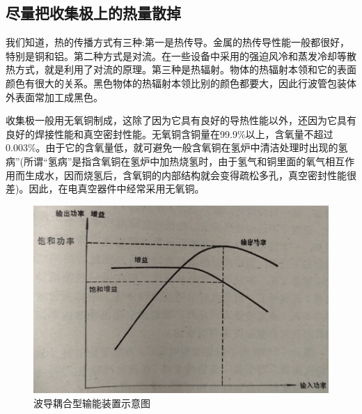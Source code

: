 \subsection{尽量把收集极上的热量散掉}
我们知道，热的传播方式有三种:第一是热传导。金属的热传导性能一般都很好，特别是铜和铝。第二种方式是对流。在一些设备中采用的强迫风冷和蒸发冷却等散热方式，就是利用了对流的原理。第三种是热辐射。物体的热辐射本领和它的表面颜色有很大的关系。黑色物体的热辐射本领比别的颜色都要大，因此行波管包装体外表面常加工成黑色。


收集极一般用无氧铜制成，这除了因为它具有良好的导热性能以外，还因为它具有良好的焊接性能和真空密封性能。无氧铜含铜量在99.9\%以上，含氧量不超过0.003\%。由于它的含氧量低，就可避免一般含氧铜在氢炉中清洁处理时出现的氢病”(所谓“氢病”是指含氧铜在氢炉中加热烧氢时，由于氢气和铜里面的氧气相互作用而生成水，因而烧氢后，含氧铜的内部结构就会变得疏松多孔，真空密封性能很差)。因此，在电真空器件中经常采用无氧铜。




\begin{figure}[phtb]
	\centering
	\includegraphics[width=0.75\linewidth]{figure/ch11-1}
	\caption{ 波导耦合型输能装置示意图}
	\label{ch11-1}
\end{figure}

